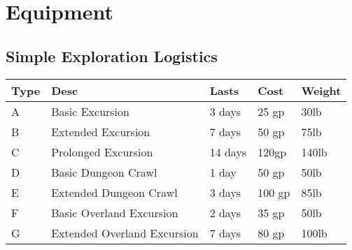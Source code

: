 \chapter{Equipment}\label{equipment}
\pagecolor{gray}\afterpage{\nopagecolor}
\newpage

\newpage



\section{Simple Exploration Logistics}

\begin{tabular}{l l l l l }
    Type & Desc & Lasts & Cost & Weight \\
    \hline
    A & Basic Excursion & 3 days & 25 gp & 30lb \\
    B & Extended Excursion & 7 days & 50 gp & 75lb \\
    C & Prolonged Excursion & 14 days & 120gp & 140lb \\
    D & Basic Dungeon Crawl & 1 day & 50 gp & 50lb \\
    E & Extended Dungeon Crawl & 3 days & 100 gp & 85lb \\
    F & Basic Overland Excursion & 2 days & 35 gp & 50lb \\
    G & Extended Overland Excursion & 7 days & 80 gp & 100lb \\
\end{tabular}


